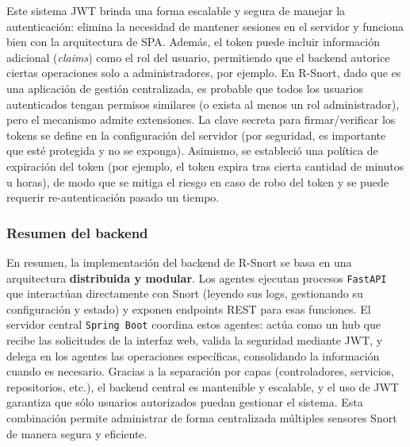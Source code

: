 \documentclass[11pt,a4paper,twoside]{report}
\begin{document}
Este sistema JWT brinda una forma escalable y segura de manejar la autenticación: elimina la necesidad de mantener sesiones en el servidor y funciona bien con la arquitectura de SPA. Además, el token puede incluir información adicional (\textit{claims}) como el rol del usuario, permitiendo que el backend autorice ciertas operaciones solo a administradores, por ejemplo. En R-Snort, dado que es una aplicación de gestión centralizada, es probable que todos los usuarios autenticados tengan permisos similares (o exista al menos un rol administrador), pero el mecanismo admite extensiones. La clave secreta para firmar/verificar los tokens se define en la configuración del servidor (por seguridad, es importante que esté protegida y no se exponga). Asimismo, se estableció una política de expiración del token (por ejemplo, el token expira tras cierta cantidad de minutos u horas), de modo que se mitiga el riesgo en caso de robo del token y se puede requerir re-autenticación pasado un tiempo.

\subsubsection{Resumen del backend}

En resumen, la implementación del backend de R-Snort se basa en una arquitectura \textbf{distribuida y modular}. Los agentes ejecutan procesos \texttt{FastAPI} que interactúan directamente con Snort (leyendo sus logs, gestionando su configuración y estado) y exponen endpoints REST para esas funciones. El servidor central \texttt{Spring Boot} coordina estos agentes: actúa como un hub que recibe las solicitudes de la interfaz web, valida la seguridad mediante JWT, y delega en los agentes las operaciones específicas, consolidando la información cuando es necesario. Gracias a la separación por capas (controladores, servicios, repositorios, etc.), el backend central es mantenible y escalable, y el uso de JWT garantiza que sólo usuarios autorizados puedan gestionar el sistema. Esta combinación permite administrar de forma centralizada múltiples sensores Snort de manera segura y eficiente.
\end{document}
